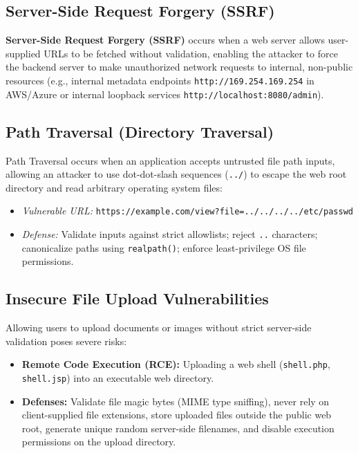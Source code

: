 \subsection{Server-Side Request Forgery (SSRF)}

\textbf{Server-Side Request Forgery (SSRF)} occurs when a web server allows user-supplied URLs to be fetched without validation, enabling the attacker to force the backend server to make unauthorized network requests to internal, non-public resources (e.g., internal metadata endpoints \texttt{http://169.254.169.254} in AWS/Azure or internal loopback services \texttt{http://localhost:8080/admin}).

\subsection{Path Traversal (Directory Traversal)}

Path Traversal occurs when an application accepts untrusted file path inputs, allowing an attacker to use dot-dot-slash sequences (\texttt{../}) to escape the web root directory and read arbitrary operating system files:
\begin{itemize}
\item \textit{Vulnerable URL:} \texttt{https://example.com/view?file=../../../../etc/passwd}
\item \textit{Defense:} Validate inputs against strict allowlists; reject \texttt{..} characters; canonicalize paths using \texttt{realpath()}; enforce least-privilege OS file permissions.
\end{itemize}

\subsection{Insecure File Upload Vulnerabilities}

Allowing users to upload documents or images without strict server-side validation poses severe risks:
\begin{itemize}
\item \textbf{Remote Code Execution (RCE):} Uploading a web shell (\texttt{shell.php}, \texttt{shell.jsp}) into an executable web directory.
\item \textbf{Defenses:} Validate file magic bytes (MIME type sniffing), never rely on client-supplied file extensions, store uploaded files outside the public web root, generate unique random server-side filenames, and disable execution permissions on the upload directory.
\end{itemize}


